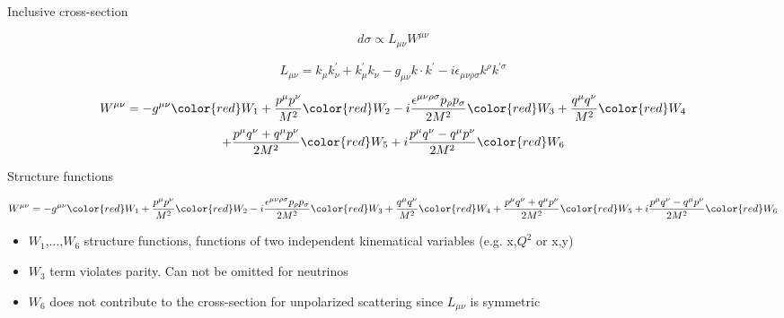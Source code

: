 \begin{frame}{Inclusive cross-section}

\begin{equation*}
 d\sigma \propto L_{\mu\nu} W^{\mu\nu}
\end{equation*}

\begin{equation*}
 L_{\mu\nu} = k_{\mu} k_{\nu}^{\prime} + k_{\mu}^{\prime} k_{\nu} - g_{\mu\nu} k \cdot k^{\prime} - i {\epsilon}_{\mu\nu\rho\sigma} k^{\rho} k^{\prime \sigma}
\end{equation*}

\begin{equation*}
 W^{\mu\nu} = -g^{\mu\nu} {\color{red}W_{1}} 
              + \frac{p^{\mu}p^{\nu}}{M^{2}} {\color{red}W_{2}} 
              - i \frac{{\epsilon}^{\mu\nu\rho\sigma}p_{\rho}p_{\sigma}}{2M^{2}} {\color{red}W_{3}} 
              + \frac{q^{\mu}q^{\nu}}{M^{2}} {\color{red}W_{4}} 
\end{equation*}
\begin{equation}
              + \frac{p^{\mu}q^{\nu}+q^{\mu}p^{\nu}}{2M^{2}} {\color{red}W_{5}} 
              + i \frac{p^{\mu}q^{\nu}-q^{\mu}p^{\nu}}{2M^{2}} {\color{red}W_{6}} 
\end{equation}

\end{frame}


\begin{frame}{Structure functions}

{\scriptsize
\begin{equation*}
 W^{\mu\nu} = -g^{\mu\nu} {\color{red}W_{1}} 
              + \frac{p^{\mu}p^{\nu}}{M^{2}} {\color{red}W_{2}} 
              - i \frac{{\epsilon}^{\mu\nu\rho\sigma}p_{\rho}p_{\sigma}}{2M^{2}} {\color{red}W_{3}} 
              + \frac{q^{\mu}q^{\nu}}{M^{2}} {\color{red}W_{4}} 
              + \frac{p^{\mu}q^{\nu}+q^{\mu}p^{\nu}}{2M^{2}} {\color{red}W_{5}} 
              + i \frac{p^{\mu}q^{\nu}-q^{\mu}p^{\nu}}{2M^{2}} {\color{red}W_{6}} 
\end{equation*}
}

\begin{itemize}
\item $W_{1}$,...,$W_{6}$ structure functions, functions of two independent kinematical variables (e.g. x,$Q^{2}$ or x,y)
\item $W_{3}$ term violates parity. Can not be omitted for neutrinos
\item $W_{6}$ does not contribute to the cross-section for unpolarized scattering since $L_{\mu\nu}$ is symmetric
\end{itemize}

\end{frame}



